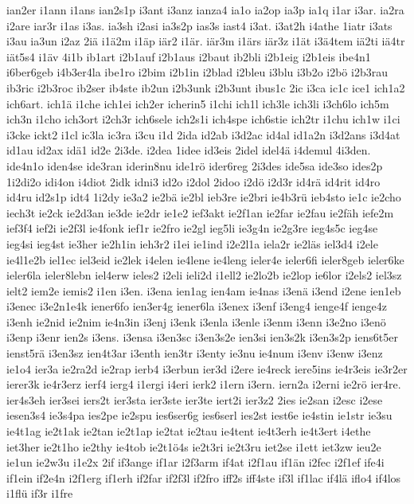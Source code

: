 {ian2er
i1ann
i1ans
ian2s1p
i3ant
i3anz
ianza4
ia1o
ia2op
ia3p
ia1q
i1ar
i3ar.
ia2ra
i2are
iar3r
i1as
i3as.
ia3sh
i2asi
ia3s2p
ias3s
iast4
i3at.
i3at2h
i4athe
1iatr
i3ats
i3au
ia3un
i2az
2iä
i1ä2m
i1äp
iär2
i1är.
iär3m
i1ärs
iär3z
i1ät
i3ä4tem
iä2ti
iä4tr
iät5s4
i1äv
4i1b
ib1art
i2b1auf
i2b1aus
i2baut
ib2bli
i2b1eig
i2b1eis
ibe4n1
i6ber6geb
i4b3er4la
ibe1ro
i2bim
i2b1in
i2blad
i2bleu
i3blu
i3b2o
i2bö
i2b3rau
ib3ric
i2b3roc
ib2ser
ib4ste
ib2un
i2b3unk
i2b3unt
ibus1c
2ic
i3ca
ic1c
ice1
ich1a2
ich6art.
ich1ä
i1che
ich1ei
ich2er
icherin5
i1chi
ich1l
ich3le
ich3li
i3ch6lo
ich5m
ich3n
i1cho
ich3ort
i2ch3r
ich6sele
ich2s1i
ich4spe
ich6stie
ich2tr
i1chu
ich1w
i1ci
i3cke
ickt2
i1cl
ic3la
ic3ra
i3cu
i1d
2ida
id2ab
i3d2ac
id4al
id1a2n
i3d2ans
i3d4at
id1au
id2ax
idä1
id2e
2i3de.
i2dea
1idee
id3eis
2idel
idel4ä
i4demul
4i3den.
ide4n1o
iden4se
ide3ran
iderin8nu
ide1rö
ider6reg
2i3des
ide5sa
ide3so
ides2p
1i2di2o
idi4on
i4diot
2idk
idni3
id2o
i2dol
2idoo
i2dö
i2d3r
id4rä
id4rit
id4ro
id4ru
id2s1p
idt4
1i2dy
ie3a2
ie2bä
ie2bl
ieb3re
ie2bri
ie4b3rü
ieb4sto
ie1c
ie2cho
iech3t
ie2ck
ie2d3an
ie3de
ie2dr
ie1e2
ief3akt
ie2f1an
ie2far
ie2fau
ie2fäh
iefe2m
ief3f4
ief2i
ie2f3l
ie4fonk
ief1r
ie2fro
ie2gl
ieg5li
ie3g4n
ie2g3re
ieg4s5c
ieg4se
ieg4si
ieg4st
ie3her
ie2h1in
ieh3r2
i1ei
ie1ind
i2e2l1a
iela2r
ie2läs
iel3d4
i2ele
ie4l1e2b
iel1ec
iel3eid
ie2lek
i4elen
ie4lene
ie4leng
ieler4e
ieler6fi
ieler8geb
ieler6ke
ieler6la
ieler8lebn
iel4erw
ieles2
i2eli
ieli2d
i1ell2
ie2lo2b
ie2lop
ie6lor
i2els2
iel3sz
ielt2
iem2e
iemis2
i1en
i3en.
i3ena
ien1ag
ien4am
ie4nas
i3enä
i3end
i2ene
ien1eb
i3enec
i3e2n1e4k
iener6fo
ien3er4g
iener6la
i3enex
i3enf
i3eng4
ienge4f
ienge4z
i3enh
ie2nid
ie2nim
ie4n3in
i3enj
i3enk
i3enla
i3enle
i3enm
i3enn
i3e2no
i3enö
i3enp
i3enr
ien2s
i3ens.
i3ensa
i3en3sc
i3en3s2e
ien3si
ien3s2k
i3en3s2p
iens6t5er
ienst5rä
i3en3sz
ien4t3ar
i3enth
ien3tr
i3enty
ie3nu
ie4num
i3env
i3enw
i3enz
ie1o4
ier3a
ie2ra2d
ie2rap
ierb4
i3erbun
ier3d
i2ere
ie4reck
iere5ins
ie4r3eis
ie3r2er
ierer3k
ie4r3erz
ierf4
ierg4
i1ergi
i4eri
ierk2
i1ern
i3ern.
iern2a
i2erni
ie2rö
ier4re.
ier4s3eh
ier3sei
iers2t
ier3sta
ier3ste
ier3te
iert2i
ier3z2
2ies
ie2san
i2esc
i2ese
iesen3s4
ie3s4pa
ies2pe
ie2spu
ies6ser6g
ies6serl
ies2st
iest6e
ie4stin
ie1str
ie3su
ie4t1ag
ie2t1ak
ie2tan
ie2t1ap
ie2tat
ie2tau
ie4tent
ie4t3erh
ie4t3ert
i4ethe
iet3her
ie2t1ho
ie2thy
ie4tob
ie2t1ö4s
ie2t3ri
ie2t3ru
iet2se
i1ett
iet3zw
ieu2e
ie1un
ie2w3u
i1e2x
2if
if3ange
if1ar
i2f3arm
if4at
i2f1au
if1än
i2fec
i2f1ef
ife4i
if1ein
if2e4n
i2f1erg
if1erh
if2far
if2f3l
if2fro
iff2s
iff4ste
if3l
if1lac
if4lä
iflo4
if4los
i1flü
if3r
i1fre
}
